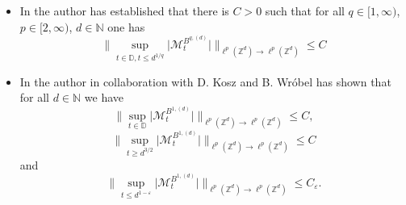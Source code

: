 \documentclass[10pt,a4paper]{amsart}
\numberwithin{equation}{section}
\newcommand{\Z}{\mathbb{Z}}
\newcommand{\D}{\mathbb{D}}
\newcommand{\N}{\mathbb{N}}
\begin{document}
\begin{itemize}
    \[
    \Big\| \sup_{0 \le t \le d^{\frac{1}{2}-\varepsilon}} \big|\mathcal{M}_t^{B^{2,(d)}}\big| \Big\|_{\ell^p(\Z^d) \to \ell^p(\Z ^d)} \le C_{\varepsilon}.
    \]
    \item In \cite{Ni2} the author has established that there is $C>0$ such that for all $q \in [1, \infty)$, $p \in [2, \infty)$, $d \in \N$ one has
    \[
    \Big\| \sup_{t \in \D, t \le d^{1/q}} \big| \mathcal{M}_t^{B^{q,(d)}} \big| \Big\|_{\ell^p(\Z^d) \to \ell^p(\Z ^d)} \le C
    \]
    \item In \cite{KNW} the author in collaboration with D. Kosz and B. Wróbel has shown that for all $d \in \N$ we have 
    \[
    \Big\| \sup_{t \in \D} \big| \mathcal{M}_t^{B^{1,(d)}} \big| \Big\|_{\ell^p(\Z^d) \to \ell^p(\Z ^d)} \le C ,
    \]
    \[
    \Big\| \sup_{t \ge d^{3/2}} \big| \mathcal{M}_t^{B^{1,(d)}} \big| \Big\|_{\ell^p(\Z^d) \to \ell^p(\Z ^d)} \le C 
    \]
    and
    \[
    \Big\| \sup_{t \le d^{1- \varepsilon}} \big| \mathcal{M}_t^{B^{1,(d)}} \big| \Big\|_{\ell^p(\Z^d) \to \ell^p(\Z ^d)} \le C_\varepsilon .
    \]
\end{itemize}
\end{document}
